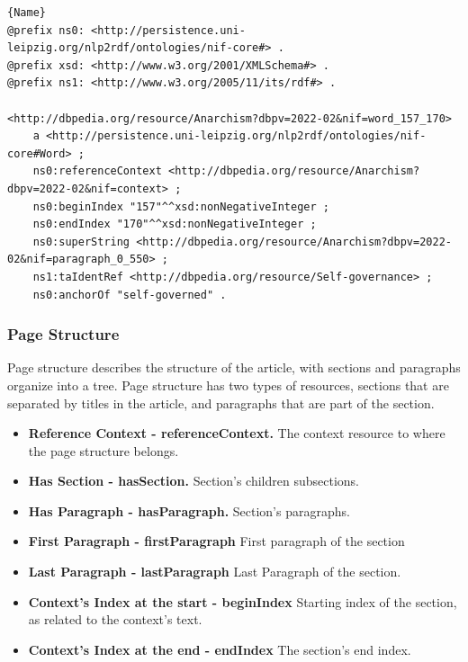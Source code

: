 \documentclass[thesis=M,english,hidelinks]{FITthesis}[2019/12/23]
\begin{document}
\begin{lstlisting}[caption=Example of an output for a Word link in NIF format,frame=tlrb,  label = {lst:nif-links}]{Name}
@prefix ns0: <http://persistence.uni-leipzig.org/nlp2rdf/ontologies/nif-core#> .
@prefix xsd: <http://www.w3.org/2001/XMLSchema#> .
@prefix ns1: <http://www.w3.org/2005/11/its/rdf#> .

<http://dbpedia.org/resource/Anarchism?dbpv=2022-02&nif=word_157_170>
	a <http://persistence.uni-leipzig.org/nlp2rdf/ontologies/nif-core#Word> ;
	ns0:referenceContext <http://dbpedia.org/resource/Anarchism?dbpv=2022-02&nif=context> ;
	ns0:beginIndex "157"^^xsd:nonNegativeInteger ;
	ns0:endIndex "170"^^xsd:nonNegativeInteger ;
	ns0:superString <http://dbpedia.org/resource/Anarchism?dbpv=2022-02&nif=paragraph_0_550> ;
	ns1:taIdentRef <http://dbpedia.org/resource/Self-governance> ;
	ns0:anchorOf "self-governed" .
\end{lstlisting}

\subsubsection{Page Structure}

Page structure describes the structure of the article, with sections and paragraphs organize into a tree. Page structure has two types of resources, sections that are separated by titles in the article, and paragraphs that are part of the section.

\begin{itemize}
	\item \textbf{Reference Context - referenceContext.} The context resource to where the page structure belongs.
	\item \textbf{Has Section - hasSection.} Section's children subsections.
	\item \textbf{Has Paragraph - hasParagraph.} Section's paragraphs.
	\item \textbf{First Paragraph - firstParagraph} First paragraph of the section
	\item \textbf{Last Paragraph - lastParagraph} Last Paragraph of the section.
	\item \textbf{Context's Index at the start - beginIndex} Starting index of the section, as related to the context's text.
	\item \textbf{Context's Index at the end - endIndex} The section's end index.
\end{itemize}
\end{document}
